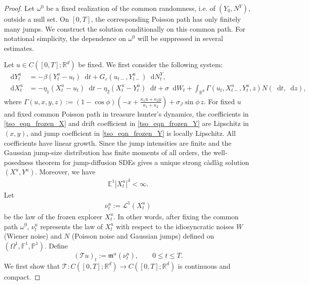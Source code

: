 \documentclass{article}
\def\m{\mathfrak{m}}
\newcommand{\E}{\mathbb{E}}
\newcommand*\der{\mathop{}\!\mathrm{d}}
\numberwithin{equation}{section}
\begin{document}
\begin{proof}
Let $\omega^0$ be a fixed realization of the common randomness, i.e. of
$(Y_0,N^Y)$, outside a null set. On $[0,T]$, the corresponding Poisson path has only finitely many jumps. We construct the solution conditionally on this common path. For notational simplicity, the dependence on $\omega^0$ will be suppressed in several estimates.

Let $u\in C([0,T];\mathbb R^d)$ be fixed.
 We first consider the following system:
\begin{align}
\der Y_t^u &=
-\beta(Y_t^u-u_t)\der t
+ G_\varepsilon(u_{t-},Y_{t-}^u)\der N_t^Y,
\label{tso_eqn_frozen_Y}
\\
\der X_t^u
&=
-\eta_1(X_t^u-u_t)\der t
-\eta_2(X_t^u-Y_t^u)\der t
+\sigma\der W_t
+\int_{\mathbb{R}^d}
\Gamma(u_t,X_{t-}^u,Y_t^u,z)N(\der t,\der z),
\label{tso_eqn_frozen_X}
\end{align}
where $\Gamma(u,x,y,z)
    :=  (1-\cos\phi)
    \left(
    -x+\frac{\kappa_1u+\kappa_2y}{\kappa_1+\kappa_2}
    \right)
    +    \sigma_J\sin\phi\,z$.
For fixed $u$ and fixed common Poisson path in treasure hunter's dynamics, the coefficients in \eqref{tso_eqn_frozen_X} and drift coefficient in \eqref{tso_eqn_frozen_Y} 
are Lipschitz in $(x,y)$, and jump coefficient in \eqref{tso_eqn_frozen_Y} is locally Lipschitz. All coefficients have linear growth. Since the jump intensities are finite and the Gaussian jump-size distribution has finite moments of all orders, the well-posedness theorem \cite[Theorem~1]{gyongy1980stochastic} for jump-diffusion SDEs gives a unique strong c\`{a}dl\`{a}g solution
$(X^u,Y^u)$. Moreover, we have
\begin{align}
    \E^1|X^u_t|^{4} < \infty. 
\end{align}
Let
\begin{align}
    \nu_t^u:=\mathcal{L}^1(X_t^u)
\end{align}
be the law of the frozen explorer $X^u_t$. In other words, after fixing the common path $\omega^0$, $\nu_t^u$  represents the law of $X_t^u$ with respect to the idiosyncratic noises $W$ (Wiener noise) and $N$ (Poisson noise and Gaussian jumps)  defined on $(\Omega^1, \mathbb{F}^1, \mathbb{P}^1)$. Define
\begin{equation*}
    (\mathcal{T} u)_t
    :=
    \m^\alpha(\nu_t^u),
    \qquad 0\le t\le T.
\end{equation*}
We first show that $\mathcal T:C([0,T];\mathbb R^d)\to C([0,T];\mathbb R^d)$ is continuous and compact.


\end{proof}
\end{document}
